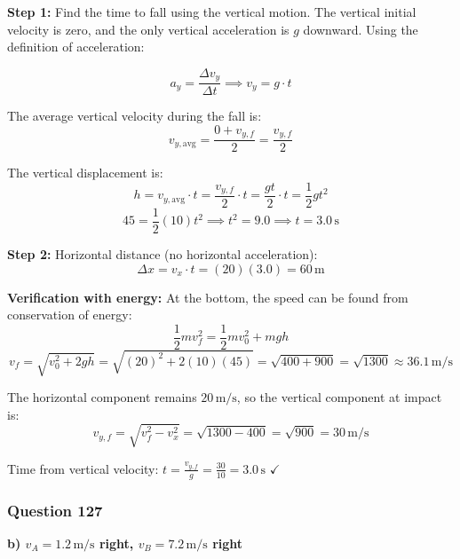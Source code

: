 \documentclass[12pt,letterpaper]{article}
\begin{document}
\begin{explanationbox}
\textbf{Step 1:} Find the time to fall using the vertical motion. The vertical initial velocity is zero, and the only vertical acceleration is $g$ downward. Using the definition of acceleration:

\[
a_y = \frac{\Delta v_y}{\Delta t} \implies v_y = g \cdot t
\]

The average vertical velocity during the fall is:
\[
v_{y,\text{avg}} = \frac{0 + v_{y,f}}{2} = \frac{v_{y,f}}{2}
\]

The vertical displacement is:
\[
h = v_{y,\text{avg}} \cdot t = \frac{v_{y,f}}{2} \cdot t = \frac{gt}{2} \cdot t = \frac{1}{2}gt^2
\]
\[
45 = \frac{1}{2}(10)t^2 \implies t^2 = 9.0 \implies t = 3.0\,\text{s}
\]

\textbf{Step 2:} Horizontal distance (no horizontal acceleration):
\[
\Delta x = v_x \cdot t = (20)(3.0) = 60\,\text{m}
\]

\textbf{Verification with energy:} At the bottom, the speed can be found from conservation of energy:
\[
\frac{1}{2}mv_f^2 = \frac{1}{2}mv_0^2 + mgh
\]
\[
v_f = \sqrt{v_0^2 + 2gh} = \sqrt{(20)^2 + 2(10)(45)} = \sqrt{400 + 900} = \sqrt{1300} \approx 36.1\,\text{m/s}
\]

The horizontal component remains $20\,\text{m/s}$, so the vertical component at impact is:
\[
v_{y,f} = \sqrt{v_f^2 - v_x^2} = \sqrt{1300 - 400} = \sqrt{900} = 30\,\text{m/s}
\]

Time from vertical velocity: $t = \frac{v_{y,f}}{g} = \frac{30}{10} = 3.0\,\text{s}$ $\checkmark$
\end{explanationbox}

\subsubsection*{Question 127}

\begin{answerbox}
\textbf{b) $v_A = 1.2\,\text{m/s}$ right, $v_B = 7.2\,\text{m/s}$ right}
\end{answerbox}
\end{document}
